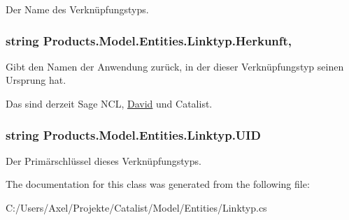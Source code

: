Der Name des Verknüpfungstyps. 

\subsubsection[{\texorpdfstring{Herkunft}{Herkunft}}]{\setlength{\rightskip}{0pt plus 5cm}string Products.\+Model.\+Entities.\+Linktyp.\+Herkunft\hspace{0.3cm}{\ttfamily [get]}, {\ttfamily [set]}}\hypertarget{class_products_1_1_model_1_1_entities_1_1_linktyp_a78c0808d53de5b36251533bbe0ddb1fe}{}\label{class_products_1_1_model_1_1_entities_1_1_linktyp_a78c0808d53de5b36251533bbe0ddb1fe}


Gibt den Namen der Anwendung zurück, in der dieser Verknüpfungstyp seinen Ursprung hat. 

Das sind derzeit Sage N\+CL, \hyperlink{namespace_david}{David} und Catalist. 
\subsubsection[{\texorpdfstring{U\+ID}{UID}}]{\setlength{\rightskip}{0pt plus 5cm}string Products.\+Model.\+Entities.\+Linktyp.\+U\+ID\hspace{0.3cm}{\ttfamily [get]}}\hypertarget{class_products_1_1_model_1_1_entities_1_1_linktyp_a1971a853a3070ef030f12e50b4f2dda0}{}\label{class_products_1_1_model_1_1_entities_1_1_linktyp_a1971a853a3070ef030f12e50b4f2dda0}


Der Primärschlüssel dieses Verknüpfungstyps. 



The documentation for this class was generated from the following file\+:\begin{DoxyCompactItemize}
\item 
C\+:/\+Users/\+Axel/\+Projekte/\+Catalist/\+Model/\+Entities/Linktyp.\+cs\end{DoxyCompactItemize}
